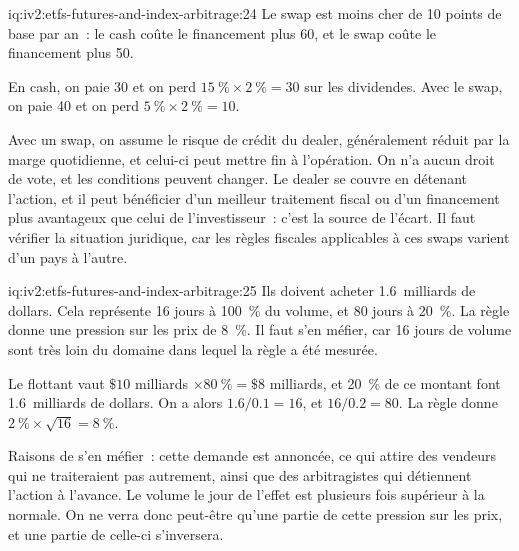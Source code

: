 \begin{solution}{iq:iv2:etfs-futures-and-index-arbitrage:24}
Le swap est moins cher de 10 points de base par an~: le cash coûte le financement plus 60, et le swap coûte le financement plus 50.

En cash, on paie 30 et on perd $15~\% \times 2~\% = 30$ sur les dividendes. Avec le swap, on paie 40 et on perd $5~\% \times 2~\% = 10$.

Avec un swap, on assume le risque de crédit du dealer, généralement réduit par la marge quotidienne, et celui-ci peut mettre fin à l'opération. On n'a aucun droit de vote, et les conditions peuvent changer. Le dealer se couvre en détenant l'action, et il peut bénéficier d'un meilleur traitement fiscal ou d'un financement plus avantageux que celui de l'investisseur~: c'est la source de l'écart. Il faut vérifier la situation juridique, car les règles fiscales applicables à ces swaps varient d'un pays à l'autre.

\end{solution}

\begin{solution}{iq:iv2:etfs-futures-and-index-arbitrage:25}
Ils doivent acheter 1.6~milliards de dollars. Cela représente 16 jours à 100~\% du volume, et 80 jours à 20~\%. La règle donne une pression sur les prix de 8~\%. Il faut s'en méfier, car 16 jours de volume sont très loin du domaine dans lequel la règle a été mesurée.

Le flottant vaut $\$10$ milliards $\times 80~\% = \$8$ milliards, et 20~\% de ce montant font 1.6~milliards de dollars. On a alors $1.6/0.1 = 16$, et $16/0.2 = 80$. La règle donne $2~\% \times \sqrt{16} = 8~\%$.

Raisons de s'en méfier~: cette demande est annoncée, ce qui attire des vendeurs qui ne traiteraient pas autrement, ainsi que des arbitragistes qui détiennent l'action à l'avance. Le volume le jour de l'effet est plusieurs fois supérieur à la normale. On ne verra donc peut-être qu'une partie de cette pression sur les prix, et une partie de celle-ci s'inversera.

\end{solution}

